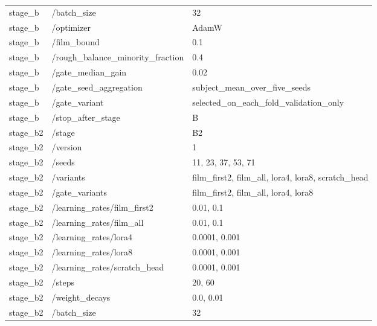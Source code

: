 \begin{longtable}{p{.65in}p{2.8in}p{3.2in}}
stage\_\allowbreak{}b & /batch\_\allowbreak{}size & 32 \\
stage\_\allowbreak{}b & /optimizer & AdamW \\
stage\_\allowbreak{}b & /film\_\allowbreak{}bound & 0.1 \\
stage\_\allowbreak{}b & /rough\_\allowbreak{}balance\_\allowbreak{}minority\_\allowbreak{}fraction & 0.4 \\
stage\_\allowbreak{}b & /gate\_\allowbreak{}median\_\allowbreak{}gain & 0.02 \\
stage\_\allowbreak{}b & /gate\_\allowbreak{}seed\_\allowbreak{}aggregation & subject\_\allowbreak{}mean\_\allowbreak{}over\_\allowbreak{}five\_\allowbreak{}seeds \\
stage\_\allowbreak{}b & /gate\_\allowbreak{}variant & selected\_\allowbreak{}on\_\allowbreak{}each\_\allowbreak{}fold\_\allowbreak{}validation\_\allowbreak{}only \\
stage\_\allowbreak{}b & /stop\_\allowbreak{}after\_\allowbreak{}stage & B \\
stage\_\allowbreak{}b2 & /stage & B2 \\
stage\_\allowbreak{}b2 & /version & 1 \\
stage\_\allowbreak{}b2 & /seeds & 11, 23, 37, 53, 71 \\
stage\_\allowbreak{}b2 & /variants & film\_\allowbreak{}first2, film\_\allowbreak{}all, lora4, lora8, scratch\_\allowbreak{}head \\
stage\_\allowbreak{}b2 & /gate\_\allowbreak{}variants & film\_\allowbreak{}first2, film\_\allowbreak{}all, lora4, lora8 \\
stage\_\allowbreak{}b2 & /learning\_\allowbreak{}rates/film\_\allowbreak{}first2 & 0.01, 0.1 \\
stage\_\allowbreak{}b2 & /learning\_\allowbreak{}rates/film\_\allowbreak{}all & 0.01, 0.1 \\
stage\_\allowbreak{}b2 & /learning\_\allowbreak{}rates/lora4 & 0.0001, 0.001 \\
stage\_\allowbreak{}b2 & /learning\_\allowbreak{}rates/lora8 & 0.0001, 0.001 \\
stage\_\allowbreak{}b2 & /learning\_\allowbreak{}rates/scratch\_\allowbreak{}head & 0.0001, 0.001 \\
stage\_\allowbreak{}b2 & /steps & 20, 60 \\
stage\_\allowbreak{}b2 & /weight\_\allowbreak{}decays & 0.0, 0.01 \\
stage\_\allowbreak{}b2 & /batch\_\allowbreak{}size & 32 \\

\end{longtable}
